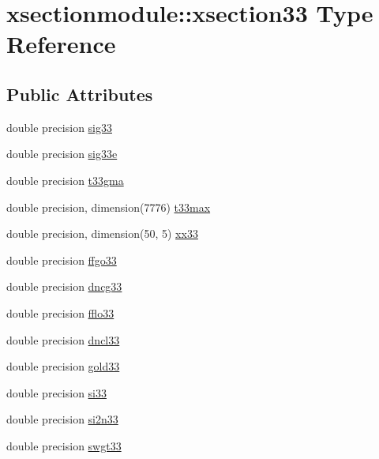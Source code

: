 \hypertarget{structxsectionmodule_1_1xsection33}{}\section{xsectionmodule\+:\+:xsection33 Type Reference}
\label{structxsectionmodule_1_1xsection33}
\subsection*{Public Attributes}
\begin{DoxyCompactItemize}
\item 
double precision \hyperlink{structxsectionmodule_1_1xsection33_abef860542eece3f52e084cc750e6bde2}{sig33}
\item 
double precision \hyperlink{structxsectionmodule_1_1xsection33_a73c95e6c485a738f601bd9543bdf163d}{sig33e}
\item 
double precision \hyperlink{structxsectionmodule_1_1xsection33_a1d3265247951aa3b956037a2441cda76}{t33gma}
\item 
double precision, dimension(7776) \hyperlink{structxsectionmodule_1_1xsection33_a8131320021807abaa8d5017b15437860}{t33max}
\item 
double precision, dimension(50, 5) \hyperlink{structxsectionmodule_1_1xsection33_aec2304e418527b520cbbf39ce6c983cf}{xx33}
\item 
double precision \hyperlink{structxsectionmodule_1_1xsection33_a8f519b9f7c33f9b69c003e09fe38e47c}{ffgo33}
\item 
double precision \hyperlink{structxsectionmodule_1_1xsection33_a3747bd55fd97426218cbb35f999ba1b9}{dncg33}
\item 
double precision \hyperlink{structxsectionmodule_1_1xsection33_ab4910a49d376b9172fee0a366190500b}{fflo33}
\item 
double precision \hyperlink{structxsectionmodule_1_1xsection33_acc6cfaf04e14aebf5981e83932f18dad}{dncl33}
\item 
double precision \hyperlink{structxsectionmodule_1_1xsection33_ae652cc3c2c23d5bf1c005af651945910}{gold33}
\item 
double precision \hyperlink{structxsectionmodule_1_1xsection33_aaf30125cdc7ade1aae69e2f029a23ed2}{si33}
\item 
double precision \hyperlink{structxsectionmodule_1_1xsection33_afa432c6920bb1cc7e0b01f1808c30547}{si2n33}
\item 
double precision \hyperlink{structxsectionmodule_1_1xsection33_a2b3f908a6d1d2a0abde09c19cf0c74ca}{swgt33}

\end{DoxyCompactItemize}

